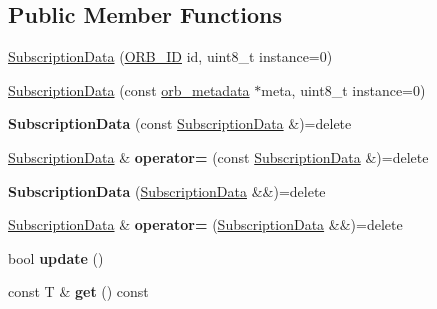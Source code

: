 \subsection*{Public Member Functions}
\begin{DoxyCompactItemize}
\item 
\hyperlink{classuORB_1_1SubscriptionData_a7d302ca4502cbd67dee434bcbec2d819}{Subscription\+Data} (\hyperlink{uORB_8h_a96af5434ec1acdf24287bd7851b0413f}{O\+R\+B\+\_\+\+ID} id, uint8\+\_\+t instance=0)
\item 
\hyperlink{classuORB_1_1SubscriptionData_a2150e11c06c9665a8132780dc7e8e354}{Subscription\+Data} (const \hyperlink{structorb__metadata}{orb\+\_\+metadata} $\ast$meta, uint8\+\_\+t instance=0)
\item 
\mbox{\label{classuORB_1_1SubscriptionData_a4cf78feac71104f295529342843aec20}} 
{\bfseries Subscription\+Data} (const \hyperlink{classuORB_1_1SubscriptionData}{Subscription\+Data} \&)=delete
\item 
\mbox{\label{classuORB_1_1SubscriptionData_a21d299cad0fed08b3a6c1cad7381887d}} 
\hyperlink{classuORB_1_1SubscriptionData}{Subscription\+Data} \& {\bfseries operator=} (const \hyperlink{classuORB_1_1SubscriptionData}{Subscription\+Data} \&)=delete
\item 
\mbox{\label{classuORB_1_1SubscriptionData_a636ee6fee75fd9e3c76f56bbbc5b6f67}} 
{\bfseries Subscription\+Data} (\hyperlink{classuORB_1_1SubscriptionData}{Subscription\+Data} \&\&)=delete
\item 
\mbox{\label{classuORB_1_1SubscriptionData_a378cfbe34e7ce31501789a4a7f104dc7}} 
\hyperlink{classuORB_1_1SubscriptionData}{Subscription\+Data} \& {\bfseries operator=} (\hyperlink{classuORB_1_1SubscriptionData}{Subscription\+Data} \&\&)=delete
\item 
\mbox{\label{classuORB_1_1SubscriptionData_a8c8967077b39cd29e07652cefe2293a9}} 
bool {\bfseries update} ()
\item 
\mbox{\label{classuORB_1_1SubscriptionData_ab75614b7adbc3ba5cbf0c3ec82e70fd2}} 
const T \& {\bfseries get} () const
\end{DoxyCompactItemize}
